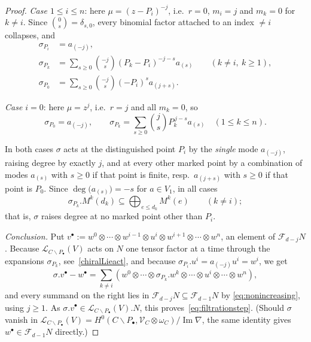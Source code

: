 \documentclass[10pt,a4paper]{amsart}
\newcommand{\LL}{\mathcal{L}}
\def\bs{\backslash}
\newcommand{\im}{\operatorname{Im}}
\def\o{\otimes}
\def\om{\omega}
\def\si{\sigma}
\def\ssq{\subseteq}
\begin{document}
\begin{proof}
\emph{Case $1\leq i\leq n$}: here $\mu=(z-P_i)^{-j}$, i.e.\ $r=0$, $m_i=j$ and $m_k=0$ for
$k\neq i$. Since $\binom{0}{s}=\delta_{s,0}$, every binomial factor attached to an index
$\neq i$ collapses, and
\begin{align*}
\si_{P_i}&=a_{(-j)},\\
\si_{P_k}&=\sum_{s\geq 0}\binom{-j}{s}(P_k-P_i)^{-j-s}a_{(s)}\qquad (k\neq i,\ k\geq 1),\\
\si_{P_0}&=\sum_{s\geq 0}\binom{-j}{s}(-P_i)^{s}a_{(j+s)}.
\end{align*}

\emph{Case $i=0$}: here $\mu=z^{j}$, i.e.\ $r=j$ and all $m_k=0$, so
\[
\si_{P_0}=a_{(-j)},\qquad
\si_{P_k}=\sum_{s\geq 0}\binom{j}{s}P_k^{\,j-s}a_{(s)}\quad (1\leq k\leq n).
\]

In both cases $\si$ acts at the distinguished point $P_i$ by the \emph{single} mode
$a_{(-j)}$, raising degree by exactly $j$, and at every other marked point by a combination
of modes $a_{(s)}$ with $s\geq 0$ if that point is finite, resp.\ $a_{(j+s)}$ with $s\geq 0$
if that point is $P_0$. Since $\deg\big(a_{(s)}\big)=-s$ for $a\in V_1$, in all cases
\begin{equation}\label{eq:nonincreasing}
\si_{P_k}.M^k(d_k)\ssq \bigoplus_{e\leq d_k}M^k(e)\qquad (k\neq i);
\end{equation}
that is, $\si$ raises degree at no marked point other than $P_i$.

\emph{Conclusion.} Put $v^\bullet:=w^0\o\cdots\o w^{i-1}\o u^i\o w^{i+1}\o\cdots\o w^n$, an
element of $\mathcal F_{d-j}N$. Because $\LL_{C\bs P_\bullet}(V)$ acts on $N$ one tensor
factor at a time through the expansions $\si_{P_k}$, see~\eqref{chiralLieact}, and because
$\si_{P_i}.u^i=a_{(-j)}u^i=w^i$, we get
\[
\si.v^\bullet-w^\bullet
=\sum_{k\neq i}\left(w^0\o\cdots\o \si_{P_k}.w^k\o\cdots\o u^i\o\cdots\o w^n\right),
\]
and every summand on the right lies in $\mathcal F_{d-j}N\ssq \mathcal F_{d-1}N$ by
\eqref{eq:nonincreasing}, using $j\geq 1$. As
$\si.v^\bullet\in \LL_{C\bs P_\bullet}(V).N$, this proves~\eqref{eq:filtrationstep}.
(Should $\si$ vanish in
$\LL_{C\bs P_\bullet}(V)=H^0(C\bs P_\bullet,\mathscr{V}_C\o\om_C)/\im\nabla$, the same identity
gives $w^\bullet\in\mathcal F_{d-1}N$ directly.)
\end{proof}
\end{document}
